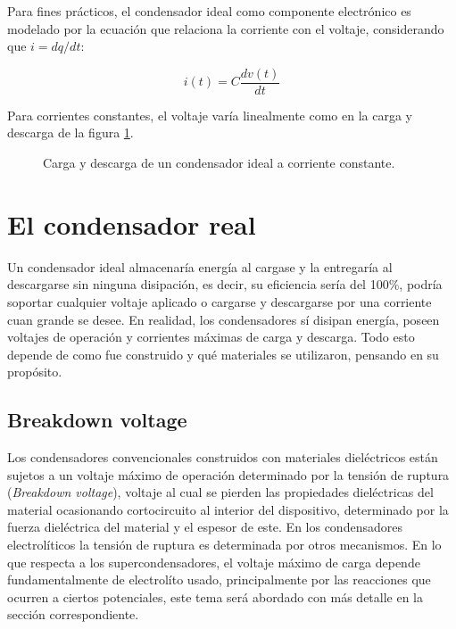 Para fines prácticos, el condensador ideal como componente electrónico es modelado por la ecuación que relaciona la corriente con el voltaje, considerando que $i = dq/dt$:

\begin{equation}
	i(t) = C \frac{dv(t)}{dt}
\end{equation}

Para corrientes constantes, el voltaje varía linealmente como en la carga y descarga de la figura \ref{fig:plot:charge-discharge_ideal_cap}.
\begin{figure}[h!]
	\caption{Carga y descarga de un condensador ideal a corriente constante.}
	\label{fig:plot:charge-discharge_ideal_cap}
\end{figure}

\section{El condensador real}
Un condensador ideal almacenaría energía al cargase y la entregaría al descargarse sin ninguna disipación, es decir, su eficiencia sería del 100\%, podría soportar cualquier voltaje aplicado o cargarse y descargarse por una corriente cuan grande se desee.  En realidad, los condensadores sí disipan energía, poseen voltajes de operación y corrientes máximas de carga y descarga. Todo esto depende de como fue construido y qué materiales se utilizaron, pensando en su propósito.

\subsection{Breakdown voltage}
Los condensadores convencionales construidos con materiales dieléctricos están sujetos a un voltaje máximo de operación determinado por la tensión de ruptura (\textit{Breakdown voltage}), voltaje al cual se pierden las propiedades dieléctricas del material ocasionando cortocircuito al interior del dispositivo, determinado por la fuerza dieléctrica del material y el espesor de este. En los condensadores electrolíticos la tensión de ruptura es determinada por otros mecanismos\citep{Yahalom1971}. En lo que respecta a los supercondensadores, el voltaje máximo de carga depende fundamentalmente de electrolíto usado, principalmente por las reacciones que ocurren a ciertos potenciales, este tema será abordado con más detalle en la sección correspondiente.


